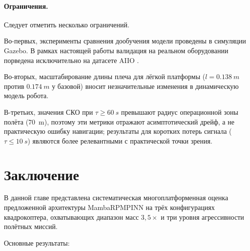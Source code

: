 \paragraph{Ограничения.}
Следует отметить несколько ограничений.
	
Во-первых, эксперименты сравнения дообучения модели проведены в симуляции Gazebo. В рамках настоящей работы валидация на реальном оборудовании порведена исключительно на датасете AIIO \cite{AIIO2026}.
	
Во-вторых, масштабирование длины плеча для лёгкой платформы ($l=\SI{0.138}{m}$ против $\SI{0.174}{m}$ у базовой) вносит незначительные изменения в динамическую модель робота.
	
В-третьих, значения СКО при $\tau\geq\SI{60}{s}$ превышают радиус операционной зоны полёта (\SI{70}{m}), поэтому эти метрики отражают асимптотический дрейф, а не практическую ошибку навигации; результаты для коротких потерь сигнала ($\tau\leq\SI{10}{s}$) являются более релевантными с практической точки зрения.
	
\section{Заключение}
\label{sec:mp_conclusion}
	
В данной главе представлена систематическая многоплатформенная оценка предложенной архитектуры MambaRPMPINN на трёх конфигурациях квадрокоптера, охватывающих диапазон масс $3{,}5\times$ и три уровня агрессивности полётных миссий.
	
Основные результаты:
	

